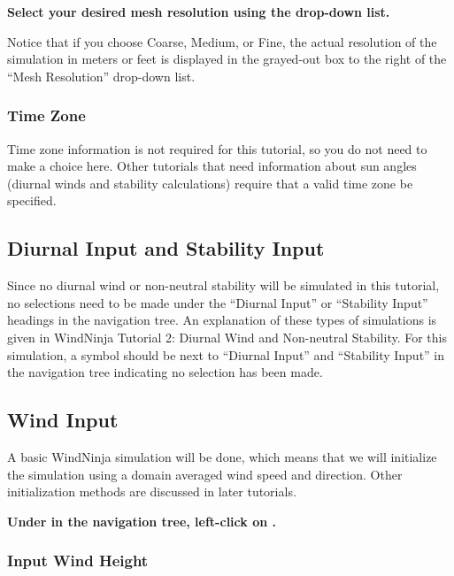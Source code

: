 \documentclass[12pt]{article}
\begin{document}
\textbf{\color{red}Select your desired mesh resolution using the  drop-down list.}

Notice that if you choose Coarse, Medium, or Fine, the actual resolution of the simulation in meters or feet is displayed in the grayed-out box to the right of the “Mesh Resolution” drop-down list.

\subsubsection{Time Zone}

Time zone information is not required for this tutorial, so you do not need to make a choice here.  Other tutorials that need information about sun angles (diurnal winds and stability calculations) require that a valid time zone be specified.

\subsection{Diurnal Input and Stability Input}
Since no diurnal wind or non-neutral stability will be simulated in this tutorial, no selections need to be made under the “Diurnal Input” or “Stability Input” headings in the navigation tree.  An explanation of these types of simulations is given in WindNinja Tutorial 2: Diurnal Wind and Non-neutral Stability.  For this simulation, a   symbol should be next to “Diurnal Input” and “Stability Input” in the navigation tree indicating no selection has been made.

\subsection{Wind Input}

A basic WindNinja simulation will be done, which means that we will initialize the simulation using a domain averaged wind speed and direction.  Other initialization methods are discussed in later tutorials.

\textbf{\color{red} Under  in the navigation tree, left-click on .}

\subsubsection{Input Wind Height}
\end{document}
